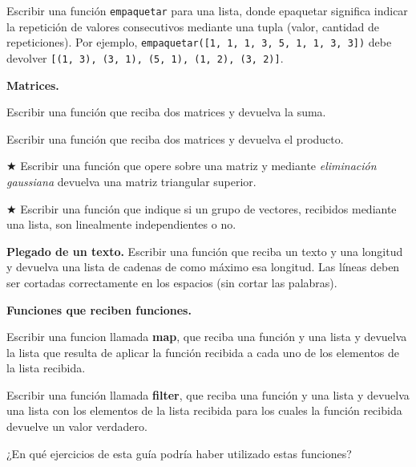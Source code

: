 \begin{ejercicio}
Escribir una función \texttt{empaquetar} para una lista, donde
epaquetar significa indicar la repetición de valores consecutivos
mediante una tupla (valor, cantidad de repeticiones). Por ejemplo,
\lstinline!empaquetar([1, 1, 1, 3, 5, 1, 1, 3, 3])! debe devolver
\lstinline![(1, 3), (3, 1), (5, 1), (1, 2), (3, 2)]!.
\end{ejercicio}


\begin{ejercicio}
{\bf Matrices.}
\begin{partes}
\item Escribir una función que reciba dos matrices y devuelva la suma.
\item Escribir una función que reciba dos matrices y devuelva el producto.
\item $\bigstar$ Escribir una función que opere sobre una matriz y mediante {\it
eliminación gaussiana} devuelva una matriz triangular superior.
\item $\bigstar$ Escribir una función que indique si un grupo de vectores, recibidos
mediante una lista, son linealmente independientes o no.
\end{partes}
\end{ejercicio}


\begin{ejercicio}
{\bf Plegado de un texto.} Escribir una función que reciba un texto y una
longitud y devuelva una lista de cadenas de como máximo esa longitud. Las
líneas deben ser cortadas correctamente en los espacios (sin cortar las
palabras).
\end{ejercicio}


\begin{ejercicio}
{\bf Funciones que reciben funciones.}
\begin{partes}
\item Escribir una funcion llamada {\bf map}, que reciba una función y una
lista y devuelva la lista que resulta de aplicar la función recibida a
cada uno de los elementos de la lista recibida.
\item Escribir una función llamada {\bf filter}, que reciba una función y
una lista y devuelva una lista con los elementos de la lista recibida para
los cuales la función recibida devuelve un valor verdadero.
\item ¿En qué ejercicios de esta guía podría haber utilizado estas
funciones?
\end{partes}
\end{ejercicio}

